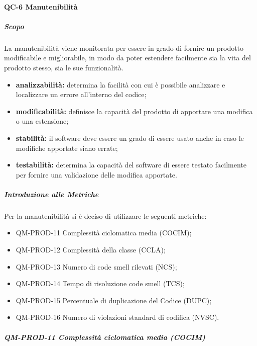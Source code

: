 		\paragraph{QC-6 Manutenibilità}
			\subparagraph{Scopo}
				La manutenibilità viene monitorata per essere in grado di fornire un prodotto modificabile e migliorabile, in modo da poter estendere facilmente sia la vita del prodotto stesso, sia le sue funzionalità.
				\begin{itemize}
					\item \textbf{analizzabilità:} determina la facilità con cui è possibile analizzare e localizzare un errore all'interno del codice;
					\item \textbf{modificabilità:} definisce la capacità del prodotto di apportare una modifica o una estensione;
					\item \textbf{stabilità:} il software deve essere un grado di essere usato anche in caso le modifiche apportate siano errate;
					\item \textbf{testabilità:} determina la capacità del software di essere testato facilmente per fornire una validazione delle modifica apportate.
				\end{itemize}
			\subparagraph{Introduzione alle Metriche}
				Per la manutenibilità si è deciso di utilizzare le seguenti metriche:
				\begin{itemize}
					\item QM-PROD-11 Complessità ciclomatica media (COCIM);
					\item QM-PROD-12 Complessità della classe (CCLA);
					\item QM-PROD-13 Numero di code smell rilevati (NCS);
					\item QM-PROD-14 Tempo di risoluzione code smell (TCS);
					\item QM-PROD-15 Percentuale di duplicazione del Codice (DUPC);
					\item QM-PROD-16 Numero di violazioni standard di codifica (NVSC).
				\end{itemize}
			\subparagraph{QM-PROD-11 Complessità ciclomatica media (COCIM)}
